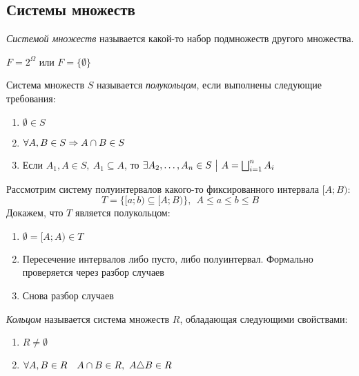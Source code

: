 \subsection{Системы множеств}

\begin{definition}
	\textit{Системой множеств} называется какой-то набор подмножеств другого множества.
\end{definition}

\begin{example}
	$F = 2^\Omega$ или $F = \{\emptyset\}$
\end{example}

\begin{definition}
	Система множеств $S$ называется \textit{полукольцом}, если выполнены следующие требования:
	\begin{enumerate}
		\item \(\emptyset \in S\)
		
		\item \(\forall A, B \in S \Rightarrow A \cap B \in S\)
		
		\item Если $A_1, A \in S,\ A_1 \subseteq A$, то \(\exists A_2, \ldots, A_n \in S \ \big|\  A = \bigsqcup_{i = 1}^n A_i\)
	\end{enumerate}
\end{definition}

\begin{example}
	Рассмотрим систему полуинтервалов какого-то фиксированного интервала $[A; B)$:
	\[
		T = \{[a; b) \subseteq [A; B)\},\ \ A \le a \le b \le B
	\]
	Докажем, что $T$ является полукольцом:
	\begin{enumerate}
		\item $\emptyset = [A; A) \in T$
		
		\item Пересечение интервалов либо пусто, либо полуинтервал. Формально проверяется через разбор случаев
		
		\item Снова разбор случаев
	\end{enumerate}
\end{example}

\begin{definition}
	\textit{Кольцом} называется система множеств $R$, обладающая следующими свойствами:
	\begin{enumerate}
		\item \(R \neq \emptyset\)
		
		\item \(\forall A, B \in R \quad A \cap B \in R,\ A \triangle B \in R\)
	\end{enumerate}
\end{definition}

